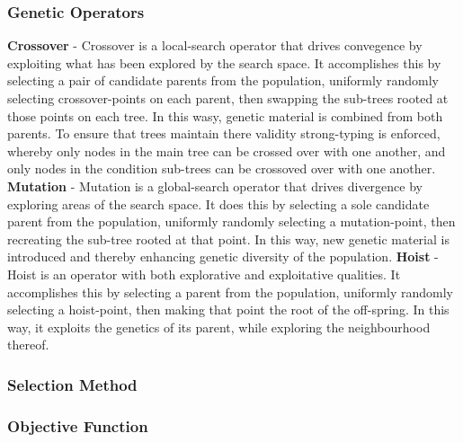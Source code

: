 \documentclass[a4paper,12pt]{article}
\begin{document}
        \subsubsection*{Genetic Operators}\label{subsubsec:geneticoperators}
            \par{
                \noindent \textbf{Crossover} - Crossover is a local-search operator that drives convegence by exploiting what has been explored by the search space. It accomplishes this 
                by selecting a pair of candidate parents from the population, uniformly randomly selecting crossover-points on each parent, then swapping the sub-trees rooted 
                at those points on each tree. In this wasy, genetic material is combined from both parents. To ensure that trees maintain there validity strong-typing is 
                enforced, whereby only nodes in the main tree can be crossed over with one another, and only nodes in the condition sub-trees can be crossoved over with
                one another.\newline 
                \newline 
                \textbf{Mutation} - Mutation is a global-search operator that drives divergence by exploring areas of the search space. It does this by selecting a sole candidate
                parent from the population, uniformly randomly selecting a mutation-point, then recreating the sub-tree rooted at that point. In this way, new genetic material is 
                introduced and thereby enhancing genetic diversity of the population.\newline 
                \newline 
                \textbf{Hoist} - Hoist is an operator with both explorative and exploitative qualities. It accomplishes this by selecting a parent from the population, 
                uniformly randomly selecting a hoist-point, then making that point the root of the off-spring. In this way, it exploits the genetics of its parent, while exploring 
                the neighbourhood thereof. 
            }
        \subsubsection*{Selection Method} \label{subsubsec:selection}
            \par{
                
            }
        \subsubsection*{Objective Function}
\end{document}
